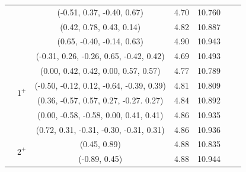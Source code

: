 \documentclass[prd,twocolumn,floatfix,nofootinbib]{revtex4}
\begin{document}
\begin{table}[!htbp]
\begin{tabular}{ccccccc}
                        &           &(-0.51, 0.37, -0.40, 0.67)                 &4.70	    &10.760 \\ 
                        &           &(0.42, 0.78, 0.43, 0.14)                   &4.82	    &10.887 \\ 
                        &           &(0.65, -0.40, -0.14, 0.63)                 &4.90	    &10.943 \\ 
                        &\multirow{6}{*}{$1^{+}$}
                                    &(-0.31, 0.26, -0.26, 0.65, -0.42, 0.42)    &4.69	    &10.493 \\ 
                        &           &(0.00, 0.42, 0.42, 0.00, 0.57, 0.57)       &4.77	    &10.789 \\ 
                        &           &(-0.50, -0.12, 0.12, -0.64, -0.39, 0.39)   &4.81	    &10.809 \\ 
                        &           &(0.36, -0.57, 0.57, 0.27, -0.27. 0.27)     &4.84	    &10.892 \\ 
                        &           &(0.00, -0.58, -0.58, 0.00, 0.41, 0.41)     &4.86	    &10.935 \\ 
                        &           &(0.72, 0.31, -0.31, -0.30, -0.31, 0.31)    &4.86	    &10.936 \\ 

                        &\multirow{2}{*}{$2^{+}$}
                                    &(0.45, 0.89)                               &4.88	    &10.835 \\ 
                        &           &(-0.89, 0.45)                              &4.88	    &10.944 \\ 
        \hline\hline
    \end{tabular}
\end{table}
\end{document}
